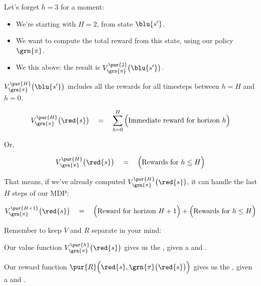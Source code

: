         Let's forget $h=3$ for a moment:

        \begin{itemize}
            \item We're starting with $H=2$, from state $\blu{s'}$.
            \item We want to compute the total reward from this state, using our policy $\grn{\pi}$.
            \item We  this above: the result is $V_{\grn{\pi}}^{\pur{2}}\big(\blu{s'} \big)$.\\
        \end{itemize}

        \begin{concept}
            $V_{\grn{\pi}}^{\pur{H}}\big(\blu{s'} \big)$ includes all the rewards for all timesteps between $h=H$ and $h=0$.

            \begin{equation*}
                V_{\grn{\pi}}^{\pur{H}}\big(\red{s} \big) \quad=\quad 
                \sum_{h=0}^{H} 
                \Big(\text{Immediate reward for horizon } h\Big)
            \end{equation*}

            Or,

            \begin{equation*}
                V_{\grn{\pi}}^{\pur{H}}\big(\red{s} \big) \quad=\quad 
                \Big( \text{Rewards for } h \leq H \Big)
            \end{equation*}

            That means, if we've already computed $V_{\grn{\pi}}^{\pur{H}}\big(\red{s}\big)$, it can handle the last $H$ steps of our MDP:

            \begin{equation*}
                V_{\grn{\pi}}^{\pur{H+1}}\big(\red{s} \big) \quad=\quad 
                \Big(\text{Reward for horizon } H+1 \Big)
                +
                \Big( \text{Rewards for } h \leq H \Big)
            \end{equation*}
        \end{concept}

        Remember to keep $V$ and $R$ separate in your mind:\\

        \begin{clarification}
            Our value function $V_{\grn{\pi}}^{\pur{h}}\big(\red{s} \big)$ gives us the , given a  and .

            Our reward function $\pur{R} \Big( \red{s},\grn{\pi}\big(\red{s}\big) \Big)$ gives us the , given a  and .

        \end{clarification}


